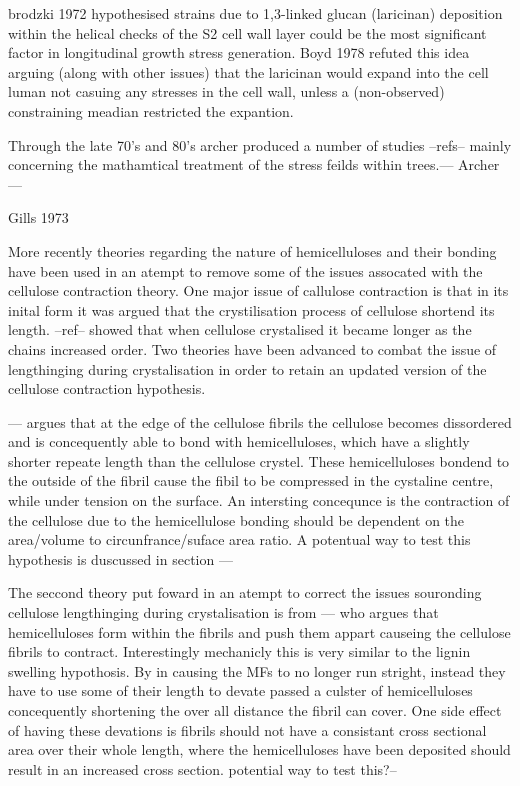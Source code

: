 \documentclass{article}
\begin{document}
brodzki 1972 hypothesised strains due to 1,3-linked glucan (laricinan)
deposition within the helical checks of the S2 cell wall layer could be the
most significant factor in longitudinal growth stress generation. Boyd 1978
refuted this idea arguing (along with other issues) that the laricinan would
expand into the cell luman not casuing any stresses in the cell wall, unless a
(non-observed) constraining meadian restricted the expantion.

Through the late 70's and 80's archer produced a number of studies --refs--
mainly concerning the mathamtical treatment of the stress feilds within
trees.---
Archer ---

Gills 1973

More recently theories regarding the nature of hemicelluloses and their bonding
have been used in an atempt to remove some of the issues assocated with the
cellulose contraction theory. One major issue of callulose contraction is that
in its inital form it was argued that the crystilisation process of cellulose
shortend its length. --ref-- showed that when cellulose crystalised it became
longer as the chains increased order. Two theories have been advanced to combat
the issue of lengthinging during crystalisation in order to retain an updated
version of the cellulose contraction hypothesis.

--- argues that at the edge of the cellulose fibrils the cellulose becomes
dissordered and is concequently able to bond with hemicelluloses, which have a
slightly shorter repeate length than the cellulose crystel. These hemicelluloses
bondend to the outside of the fibril cause the fibil to be compressed in the
cystaline centre, while under tension on the surface. An intersting concequnce
is the contraction of the cellulose due to the hemicellulose bonding should be
dependent on the area/volume to circunfrance/suface area ratio. A potentual way
to test this hypothesis is duscussed in section ---

The seccond theory put foward in an atempt to correct the issues souronding
cellulose lengthinging during crystalisation is from --- who argues that
hemicelluloses form within the fibrils and push them appart causeing the
cellulose fibrils to contract. Interestingly mechanicly this is very similar to
the lignin swelling hypothosis. By in causing the MFs to no longer run stright,
instead they have to use some of their length to devate passed a culster of
hemicelluloses concequently shortening the over all distance the fibril can
cover. One side effect of having these devations is fibrils should not have a
consistant cross sectional area over their whole length, where the
hemicelluloses have been deposited should result in an increased cross section.
potential way to test this?--
\end{document}
